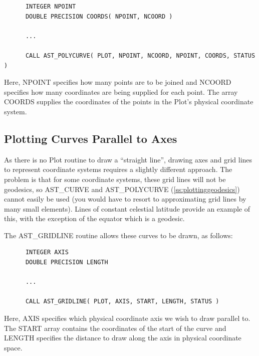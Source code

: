 \documentclass[twoside,11pt]{article}
\newcommand{\htmlref}[2]{#1}
\newcommand{\secref}[1]{\S\ref{#1}}
\renewcommand{\secref}[1]{\ref{#1}}
\begin{document}
\small
\begin{verbatim}
      INTEGER NPOINT
      DOUBLE PRECISION COORDS( NPOINT, NCOORD )

      ...

      CALL AST_POLYCURVE( PLOT, NPOINT, NCOORD, NPOINT, COORDS, STATUS )
\end{verbatim}
\normalsize

Here, NPOINT specifies how many points are to be joined and NCOORD
specifies how many coordinates are being supplied for each point.  The
array COORDS supplies the coordinates of the points in the Plot's
physical coordinate system.

\subsection{Plotting Curves Parallel to Axes}

As there is no \htmlref{Plot}{Plot} routine to draw a ``straight line'', drawing axes
and grid lines to represent coordinate systems requires a slightly
different approach. The problem is that for some coordinate systems,
these grid lines will not be geodesics, so \htmlref{AST\_CURVE}{AST_CURVE} and
\htmlref{AST\_POLYCURVE}{AST_POLYCURVE} (\secref{ss:plottinggeodesics}) cannot easily be used
(you would have to resort to approximating grid lines by many small
elements). Lines of constant celestial latitude provide an example of
this, with the exception of the equator which is a geodesic.

The \htmlref{AST\_GRIDLINE}{AST_GRIDLINE} routine allows these curves to be drawn, as follows:

\small
\begin{verbatim}
      INTEGER AXIS
      DOUBLE PRECISION LENGTH

      ...

      CALL AST_GRIDLINE( PLOT, AXIS, START, LENGTH, STATUS )
\end{verbatim}
\normalsize

Here, AXIS specifies which physical coordinate axis we wish to draw
parallel to. The START array contains the coordinates of the start of
the curve and LENGTH specifies the distance to draw along the axis in
physical coordinate space.
\end{document}

